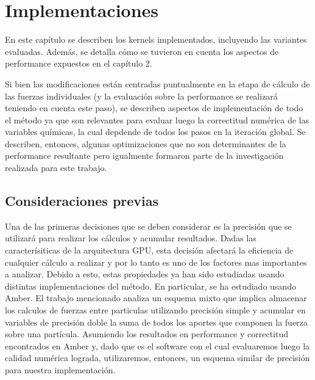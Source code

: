 \chapter{Implementaciones}

En este capítulo se describen los kernels implementados, incluyendo las variantes evaluadas. Además, se detalla cómo se tuvieron en cuenta los aspectos de performance expuestos en el capítulo 2.

Si bien las modificaciones están centradas puntualmente en la etapa de cálculo de las fuerzas individuales (y la evaluación sobre la performance se realizará teniendo en cuenta este paso),
se describen aspectos de implementación de todo el método ya que son relevantes para evaluar luego la correctitud numérica de las variables químicas, la cual depdende de todos los pasos en la iteración global.
Se describen, entonces, algunas optimizaciones que no son determinantes de la performance resultante pero igualmente formaron parte de la investigación realizada para este trabajo.


\section{Consideraciones previas}

Una de las primeras decisiones que se deben considerar es la precisión que se utilizará para realizar los cálculos y acumular resultados. 
Dadas las caracterísiticas de la arquitectura GPU, esta decisión afectará la eficiencia de cualquier cálculo a realizar y por lo tanto es uno de los factores mas importantes a analizar.
Debido a esto, estas propiedades ya han sido estudiadas usando distintas implementaciones del método. En particular, se ha estudiado usando Amber\cite{le2013spfp}. 
El trabajo mencionado analiza un esquema mixto que implica almacenar los calculos de fuerzas entre particulas utilizando precisión simple y acumular en variables de precisión doble
la suma de todos los aportes que componen la fuerza sobre una partícula. Asumiendo los resultados en performance y correctitud encontrados en Amber y,
dado que es el software con el cual evaluaremos luego la calidad numérica lograda, utilizaremos, entonces, un esquema similar de precisión para nuestra implementación.


